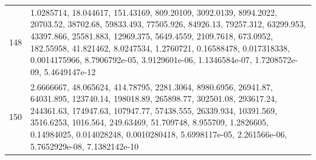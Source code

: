 \documentclass[11pt]{article}
\theoremstyle{definition}
\theoremstyle{remark}
\begin{document}
{\begin{longtable}{r p{}}
148 & 1.0285714, 18.044617, 151.43169, 809.20109, 3092.0139, 8994.2022, 20703.52, 38702.68, 59833.493, 77505.926, 84926.13, 79257.312, 63299.953, 43397.866, 25581.883, 12969.375, 5649.4559, 2109.7618, 673.0952, 182.55958, 41.821462, 8.0247534, 1.2760721, 0.16588478, 0.017318338, 0.0014175966, 8.7906792e-05, 3.9129601e-06, 1.1346584e-07, 1.7208572e-09, 5.4649147e-12 \\
150 & 2.6666667, 48.065624, 414.78795, 2281.3064, 8980.6956, 26941.87, 64031.895, 123740.14, 198018.89, 265898.77, 302501.08, 293617.24, 244361.63, 174947.63, 107947.77, 57438.555, 26339.934, 10391.569, 3516.6253, 1016.564, 249.63469, 51.709748, 8.955709, 1.2826605, 0.14984025, 0.014028248, 0.0010280418, 5.6998117e-05, 2.261566e-06, 5.7652929e-08, 7.1382142e-10 \\
\bottomrule
\end{longtable}}
\end{document}
